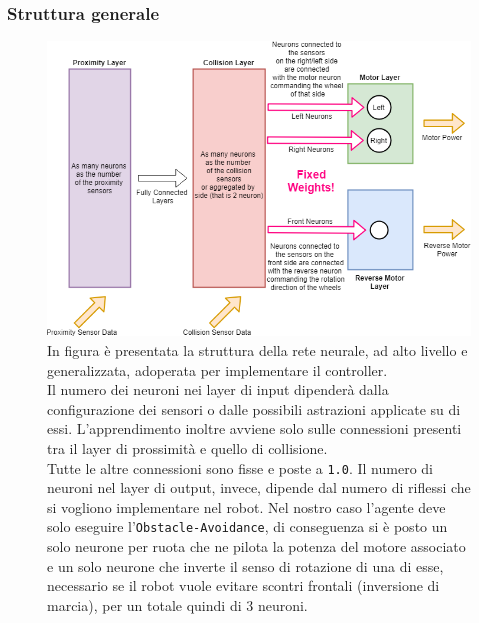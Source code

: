 \subsubsection{Struttura generale}

\begin{figure}[H]
    \centering
    \includegraphics[scale=0.6]{figures/dac_ann_structure_generic.png}
    \caption{In figura è presentata la struttura della rete neurale, ad alto livello e generalizzata, adoperata per implementare il controller.\\ 
    Il numero dei neuroni nei layer di input dipenderà dalla configurazione dei sensori o dalle possibili astrazioni applicate su di essi. L'apprendimento inoltre avviene solo sulle connessioni presenti tra il layer di prossimità e quello di collisione.\\ 
    Tutte le altre connessioni sono fisse e poste a \texttt{1.0}. 
    Il numero di neuroni nel layer di output, invece, dipende dal numero di riflessi che si vogliono implementare nel robot. 
    Nel nostro caso l'agente deve solo eseguire l'\texttt{Obstacle-Avoidance}, di conseguenza si è posto un solo neurone per ruota che ne pilota la potenza del motore associato e un solo neurone che inverte il senso di rotazione di una di esse, necessario se il robot vuole evitare scontri frontali (inversione di marcia), per un totale quindi di 3 neuroni.}
    \label{fig:AnnStructure}
\end{figure}

\newpage

